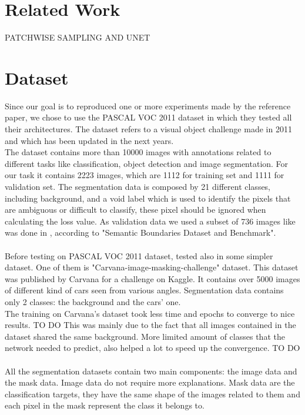 \documentclass[10pt,twocolumn,letterpaper]{article}
\begin{document}
\section{Related Work}

PATCHWISE SAMPLING AND UNET

\section{Dataset}

Since our goal is to reproduced one or more experiments made by the reference paper\cite{projectPaper}, we chose to use the PASCAL VOC 2011\cite{pascal-voc-2011} dataset in which they tested all their architectures.
The dataset refers to a visual object challenge made in 2011 and which has been updated in the next years. \\
The dataset contains more than 10000 images with annotations related to different tasks like classification, object detection and image segmentation.
For our task it contains 2223 images, which are 1112 for training set and 1111 for validation set.
The segmentation data is composed by 21 different classes, including background, and a void label which is used to identify the pixels that are ambiguous or difficult to classify, these pixel should be ignored when calculating the loss value.
As validation data we used a subset of 736 images like was done in \cite{projectPaper}, according to "Semantic Boundaries Dataset and Benchmark"\cite{BharathICCV2011}. \\ \\
Before testing on PASCAL VOC 2011 dataset, tested also in some simpler dataset.
One of them is "Carvana-image-masking-challenge"\cite{carvana} dataset. This dataset was published by Carvana for a challenge on Kaggle. It contains over 5000 images of different kind of cars seen from various angles. Segmentation data contains only 2 classes: the background and the cars' one. \\
The training on Carvana's dataset took less time and epochs to converge to nice results. TO DO
This was mainly due to the fact that all images contained in the dataset shared the same background. More limited amount of classes that the network needed to predict, also helped a lot to speed up the convergence. TO DO \\ \\
All the segmentation datasets contain two main components: the image data and the mask data. Image data do not require more explanations. Mask data are the classification targets, they have the same shape of the images related to them and each pixel in the mask represent the class it belongs to.
\end{document}
